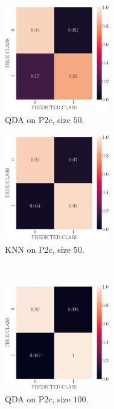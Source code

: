 \documentclass[11pt, a4 paper]{article}
\begin{document}
\begin{figure}[!htbp]
\centering
    \begin{subfigure}[!htbp]{0.24\textwidth}
       \centering
       \includegraphics[width=1.8in]{../results/ex2/conf_mtx_QD_ML_dataset_P2c_size_50.pdf}
       \caption{QDA on P2c, size $50$.}
       \label{fig:QDA_rr20_P2c_50}
    \end{subfigure}
\quad
    \begin{subfigure}[!htbp]{0.24\textwidth}
       \centering
       \includegraphics[width=1.8in]{../results/ex2/conf_mtx_KNN_dataset_P2c_size_50.pdf}
       \caption{KNN on P2c, size $50$.}
       \label{fig:KNN_rr20_P2c_50}
    \end{subfigure}
\\  
    \begin{subfigure}[!htbp]{0.24\textwidth}
       \centering
       \includegraphics[width=1.8in]{../results/ex2/conf_mtx_QD_ML_dataset_P2c_size_100.pdf}
       \caption{QDA on P2c, size $100$.}
       \label{fig:QDA_rr20_P2c_100}
    \end{subfigure}
\quad    
    \begin{subfigure}[!htbp]{0.24\textwidth}

\end{subfigure}
\end{figure}
\end{document}
